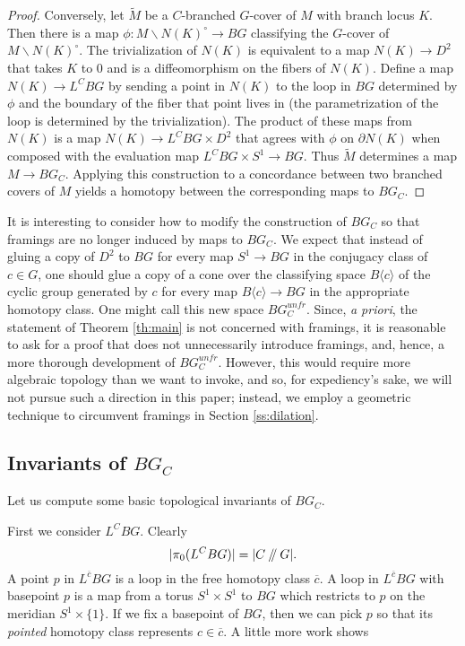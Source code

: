 \documentclass[10pt,twocolumn,amsmath,amssymb,aps,pra,secnumarabic,
    nofootinbib,groupedaddress]{revtex4-1}
\renewcommand{\setminus}{\smallsetminus}
\newcommand{\sslash}{\mathbin{/\mkern-5mu/}}
\begin{document}
\begin{proof}
Conversely, let $\tilde{M}$ be a $C$-branched $G$-cover of $M$ with branch locus $K$.  Then there is a map $\phi: M \setminus N(K)^\circ \to BG$ classifying the $G$-cover of $M\setminus N(K)^\circ$.  The trivialization of $N(K)$ is equivalent to a map $N(K) \to D^2$ that takes $K$ to 0 and is a diffeomorphism on the fibers of $N(K)$.  Define a map $N(K) \to L^CBG$ by sending a point in $N(K)$ to the loop in $BG$ determined by $\phi$ and the boundary of the fiber that point lives in (the parametrization of the loop is determined by the trivialization).  The product of these maps from $N(K)$ is a map $N(K) \to L^CBG \times D^2$ that agrees with $\phi$ on $\partial N(K)$ when composed with the evaluation map $L^CBG \times S^1 \to BG$.  Thus $\tilde{M}$ determines a map $M \to BG_C$.  Applying this construction to a concordance between two branched covers of $M$ yields a homotopy between the corresponding maps to $BG_C$.
\end{proof}

It is interesting to consider how to modify the construction of $BG_C$ so that framings are no longer induced by maps to $BG_C$.  We expect that instead of gluing a copy of $D^2$ to $BG$ for every map $S^1 \to BG$ in the conjugacy class of $c \in G$, one should glue a copy of a cone over the classifying space $B\langle c \rangle$ of the cyclic group generated by $c$ for every map $B\langle c \rangle \to BG$ in the appropriate homotopy class.  One might call this new space $BG_C^{unfr}$.  Since, \emph{a priori}, the statement of Theorem \ref{th:main} is not concerned with framings, it is reasonable to ask for a proof that does not unnecessarily introduce framings, and, hence, a more thorough development of $BG_C^{unfr}$.  However, this would require more algebraic topology than we want to invoke, and so, for expediency's sake, we will not pursue such a direction in this paper; instead, we employ a geometric technique to circumvent framings in Section \ref{ss:dilation}.

\subsection{Invariants of $BG_C$}
\label{ss:homology}
Let us compute some basic topological invariants of $BG_C$.

First we consider $L^CBG$.  Clearly
\[ |\pi_0(L^CBG)| = |C\sslash G|. \]
A point $p$ in $L^{\overline{c}}BG$ is a loop in the free homotopy class $\overline{c}$.  A loop in $L^{\overline{c}}BG$ with basepoint $p$ is a map from a torus $S^1 \times S^1$ to $BG$ which restricts to $p$ on the meridian $S^1 \times \{1\}$.  If we fix a basepoint of $BG$, then we can pick $p$ so that its \emph{pointed} homotopy class represents $c \in \overline{c}$.  A little more work shows
\end{document}
